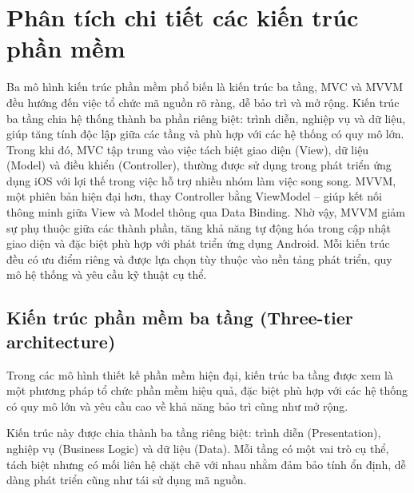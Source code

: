 \section{Phân tích chi tiết các kiến trúc phần mềm}

\begin{flushleft}
  \hspace*{0.8cm}Ba mô hình kiến trúc phần mềm phổ biến là kiến trúc ba tầng, MVC và MVVM đều hướng đến việc tổ chức mã nguồn rõ ràng, dễ bảo trì và mở rộng. Kiến trúc ba tầng chia hệ thống thành ba phần riêng biệt: trình diễn, nghiệp vụ và dữ liệu, giúp tăng tính độc lập giữa các tầng và phù hợp với các hệ thống có quy mô lớn. Trong khi đó, MVC tập trung vào việc tách biệt giao diện (View), dữ liệu (Model) và điều khiển (Controller), thường được sử dụng trong phát triển ứng dụng iOS với lợi thế trong việc hỗ trợ nhiều nhóm làm việc song song. MVVM, một phiên bản hiện đại hơn, thay Controller bằng ViewModel – giúp kết nối thông minh giữa View và Model thông qua Data Binding. Nhờ vậy, MVVM giảm sự phụ thuộc giữa các thành phần, tăng khả năng tự động hóa trong cập nhật giao diện và đặc biệt phù hợp với phát triển ứng dụng Android. Mỗi kiến trúc đều có ưu điểm riêng và được lựa chọn tùy thuộc vào nền tảng phát triển, quy mô hệ thống và yêu cầu kỹ thuật cụ thể.
  \end{flushleft}
  
  

\subsection{Kiến trúc phần mềm ba tầng (Three-tier architecture)}
\renewcommand{\labelitemi}{--}    
    \begin{flushleft}
        \hspace*{0.8cm}Trong các mô hình thiết kế phần mềm hiện đại, kiến trúc ba tầng được xem là một phương pháp tổ chức phần mềm hiệu quả, đặc biệt phù hợp với các hệ thống có quy mô lớn và yêu cầu cao về khả năng bảo trì cũng như mở rộng.
    \end{flushleft}

    \begin{flushleft}
      \hspace*{0.8cm}Kiến trúc này được chia thành ba tầng riêng biệt: trình diễn (Presentation), nghiệp vụ (Business Logic) và dữ liệu (Data).
      Mỗi tầng có một vai trò cụ thể, tách biệt nhưng có mối liên hệ chặt chẽ với nhau nhằm đảm bảo tính ổn định, dễ dàng phát triển cũng như tái sử dụng mã nguồn.
    \end{flushleft}

